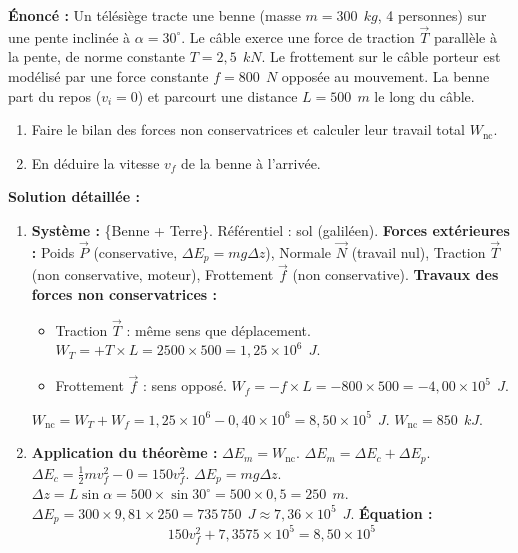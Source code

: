 \documentclass[11pt]{article}
\begin{document}
\begin{exoresolu}
    \textbf{Énoncé :} Un télésiège tracte une benne (masse $m = 300\ \SI{}{kg}$, 4 personnes) sur une pente inclinée à $\alpha = 30^\circ$. Le câble exerce une force de traction $\vec{T}$ parallèle à la pente, de norme constante $T = 2,5\ \SI{}{kN}$. Le frottement sur le câble porteur est modélisé par une force constante $f = 800\ \SI{}{N}$ opposée au mouvement. La benne part du repos ($v_i=0$) et parcourt une distance $L = 500\ \SI{}{m}$ le long du câble.
    \begin{enumerate}
        \item Faire le bilan des forces non conservatrices et calculer leur travail total $W_{\text{nc}}$.
        \item En déduire la vitesse $v_f$ de la benne à l'arrivée.
    \end{enumerate}
    \tcblower
    \textbf{Solution détaillée :}
    \begin{enumerate}
        \item \textbf{Système :} \{Benne + Terre\}. Référentiel : sol (galiléen).
        \textbf{Forces extérieures :} Poids $\vec{P}$ (conservative, $\Delta E_p = mg\Delta z$), Normale $\vec{N}$ (travail nul), Traction $\vec{T}$ (non conservative, moteur), Frottement $\vec{f}$ (non conservative).
        \textbf{Travaux des forces non conservatrices :}
        \begin{itemize}
            \item Traction $\vec{T}$ : même sens que déplacement. $W_T = + T \times L = 2500 \times 500 = 1,25 \times 10^6\ \SI{}{J}$.
            \item Frottement $\vec{f}$ : sens opposé. $W_f = - f \times L = -800 \times 500 = -4,00 \times 10^5\ \SI{}{J}$.
        \end{itemize}
        $W_{\text{nc}} = W_T + W_f = 1,25 \times 10^6 - 0,40 \times 10^6 = 8,50 \times 10^5\ \SI{}{J}$.
        $\boxed{W_{\text{nc}} = 850\ \SI{}{kJ}}$.
        \item \textbf{Application du théorème :} $\Delta E_m = W_{\text{nc}}$.
        $\Delta E_m = \Delta E_c + \Delta E_p$.
        $\Delta E_c = \frac{1}{2} m v_f^2 - 0 = 150 v_f^2$.
        $\Delta E_p = m g \Delta z$. $\Delta z = L \sin\alpha = 500 \times \sin 30^\circ = 500 \times 0,5 = 250\ \SI{}{m}$.
        $\Delta E_p = 300 \times 9,81 \times 250 = 735\,750\ \SI{}{J} \approx 7,36 \times 10^5\ \SI{}{J}$.
        \textbf{Équation :}
        \[ 150 v_f^2 + 7,3575 \times 10^5 = 8,50 \times 10^5 \]

\end{enumerate}
\end{exoresolu}
\end{document}
